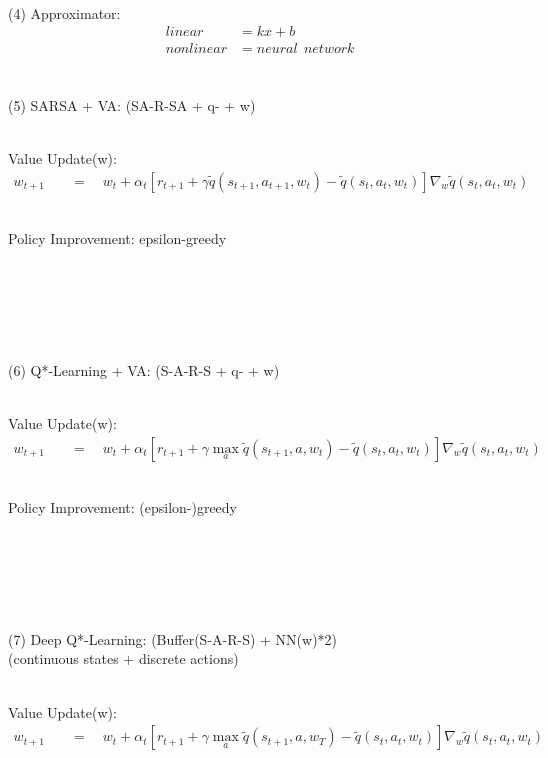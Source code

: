 \documentclass{article}
\begin{document}
~ \\[3pt]
(4) Approximator: 
\begin{align*}
    linear    &= kx + b \\[3pt]
    nonlinear &= neural \ \ network \\[3pt]
\end{align*}


\newpage


~ \\[3pt]
(5) SARSA + VA: \qquad (SA-R-SA + q- + w) 

~ \\[3pt]
Value Update(w): 
\begin{align*}
    w_{t+1} & 
            \quad = \quad w_{t} + \alpha_{t} 
            [ r_{t+1} + \gamma \tilde{q}(s_{t+1}, a_{t+1}, w_{t}) 
            - \tilde{q}(s_{t}, a_{t}, w_{t}) ] 
            \nabla_{w} \tilde{q}(s_{t}, a_{t}, w_{t}) 
\end{align*}

~ \\[3pt]
Policy Improvement: epsilon-greedy


~ \\[3pt]
~ \\[3pt]
~ \\[3pt]
~ \\[3pt]
~ \\[3pt]
(6) Q*-Learning + VA: \qquad (S-A-R-S + q- + w) 

~ \\[3pt]
Value Update(w): 
\begin{align*}
    w_{t+1} & 
            \quad = \quad w_{t} + \alpha_{t} 
            [ r_{t+1} + \gamma \max_{a} \tilde{q}(s_{t+1}, a, w_{t}) 
            - \tilde{q}(s_{t}, a_{t}, w_{t}) ] 
            \nabla_{w} \tilde{q}(s_{t}, a_{t}, w_{t}) 
\end{align*}

~ \\[3pt]
Policy Improvement: (epsilon-)greedy 


~ \\[3pt]
~ \\[3pt]
~ \\[3pt]
~ \\[3pt]
~ \\[3pt]
(7) Deep Q*-Learning: \qquad (Buffer(S-A-R-S) + NN(w)*2) \\[3pt]
\quad (continuous states + discrete actions)

~ \\[3pt]
Value Update(w): 
\begin{align*}
    w_{t+1} & 
            \quad = \quad w_{t} + \alpha_{t} 
            [ r_{t+1} + \gamma \max_{a} \tilde{q}(s_{t+1}, a, w_{T}) 
            - \tilde{q}(s_{t}, a_{t}, w_{t}) ] 
            \nabla_{w} \tilde{q}(s_{t}, a_{t}, w_{t}) 
\end{align*}
\end{document}
